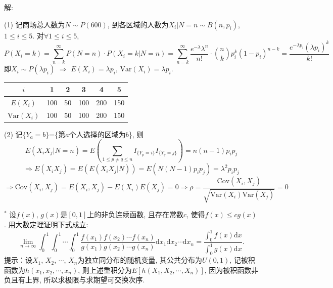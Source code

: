 \documentclass[standard]{ExBook}
\begin{document}
\begin{qitems}
\vspace{-5em}

    \begin{bbox}
解: 

(1) 记商场总人数为$N\sim P(600)$, 到各区域的人数为$X_i|N=n\sim B(n,p_i)$, $1\leq i\leq 5$. 对$\forall 1\leq i\leq 5$,
$$\displaystyle P(X_i=k)=\sum\limits_{n=k}^{\infty}P(N=n)\cdot P(X_i=k|N=n)=\sum\limits_{n=k}^{\infty}\frac{e^{-\lambda}\lambda^n}{n!}\cdot \binom{n}{k}p_i^k(1-p_i)^{n-k}=\frac{e^{-\lambda p_i}(\lambda p_i)^k}{k!}$$
即$X_i\sim P(\lambda p_i)$ $\Longrightarrow$ $E(X_i)=\lambda p_i$, $\mathrm{Var}(X_i)=\lambda p_i$.

\vspace{0.5em}
\setlength{\tabcolsep}{1.75em}
\begin{minipage}[c]{1\textwidth}
\centering
\begin{tabular}{c|c|c|c|c|c}
    $i$ & 1 & 2 & 3 & 4 & 5\\
    \hline
    $E(X_i)$ & 100 & 50 & 100 & 200 & 150\\
    \hline
    $\mathrm{Var}(X_i)$ & 100 & 50 & 100 & 200 & 150
\end{tabular}
\end{minipage}

(2) 记$\{Y_{a}=b\}$=\{第$a$个人选择的区域为$b$\}, 则
$$\displaystyle E(X_i X_j|N=n)=E\left(\sum\limits_{1\leq p\neq q\leq n}I_{\{Y_p=i\}}I_{\{Y_q=j\}}\right)=n(n-1)p_i p_j$$
$$\Longrightarrow E(X_i X_j)=E(E(X_i X_j|N))=E(N(N-1)p_i p_j)=\lambda^2 p_i p_j$$
$$\displaystyle \Longrightarrow \mathrm{Cov}(X_i,X_j)=E(X_i,X_j)-E(X_i)E(X_j)=0 \Longrightarrow \rho=\frac{\mathrm{Cov}(X_i,X_j)}{\sqrt{\mathrm{Var}(X_i)\mathrm{Var}(X_j)}}=0$$
    \end{bbox}

\vspace{-5em}

    \begin{bbox}
    \begin{shaded}
        \qitem$^{*}$
设$f(x)$, $g(x)$是$[0,1]$上的非负连续函数, 且存在常数$c$, 使得$f(x)\leq c g(x)$. 用大数定理证明下式成立:
$$\lim\limits_{n\to\infty}\displaystyle\int_{0}^{1}\int_{0}^{1}\cdots\int_{0}^{1}\frac{f(x_1)f(x_2)\cdots f(x_n)}{g(x_1)g(x_2)\cdots g(x_n)}\mathrm{d}x_1\mathrm{d}x_2\cdots\mathrm{d}x_n=\frac{\int_{0}^{1}f(x)\mathrm{d}x}{\int_{0}^{1}g(x)\mathrm{d}x}.$$
提示：设$X_1$, $X_2$, $\cdots$, $X_n$为独立同分布的随机变量, 其公共分布为$U(0,1)$, 记被积函数为$h(x_1,x_2,\cdots,x_n)$, 则上述重积分为$E[h(X_1,X_2,\cdots,X_n)]$, 因为被积函数非负且有上界, 所以求极限与求期望可交换次序.
    \end{shaded}
    \end{bbox}


\end{qitems}
\end{document}

